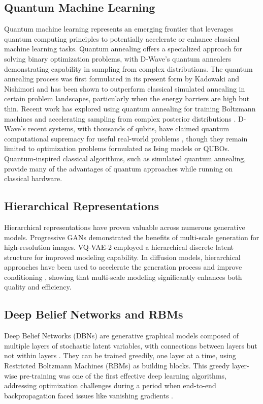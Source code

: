 \documentclass[10pt,twocolumn,letterpaper]{article}
\begin{document}
\subsection{Quantum Machine Learning}
Quantum machine learning represents an emerging frontier that leverages quantum computing principles to potentially accelerate or enhance classical machine learning tasks. Quantum annealing \cite{quantum_annealing, kadowaki1998quantum} offers a specialized approach for solving binary optimization problems, with D-Wave's quantum annealers demonstrating capability in sampling from complex distributions. The quantum annealing process was first formulated in its present form by Kadowaki and Nishimori \cite{kadowaki1998quantum} and has been shown to outperform classical simulated annealing \cite{kirkpatrick1983optimization} in certain problem landscapes, particularly when the energy barriers are high but thin. Recent work has explored using quantum annealing for training Boltzmann machines \cite{qbm, amin2018quantum} and accelerating sampling from complex posterior distributions \cite{quantum_sampling}. D-Wave's recent systems, with thousands of qubits, have claimed quantum computational supremacy for useful real-world problems \cite{dwave2025beyond}, though they remain limited to optimization problems formulated as Ising models or QUBOs. Quantum-inspired classical algorithms, such as simulated quantum annealing, provide many of the advantages of quantum approaches while running on classical hardware.

\subsection{Hierarchical Representations}
Hierarchical representations have proven valuable across numerous generative models. Progressive GANs \cite{pggan} demonstrated the benefits of multi-scale generation for high-resolution images. VQ-VAE-2 \cite{vqvae2} employed a hierarchical discrete latent structure for improved modeling capability. In diffusion models, hierarchical approaches have been used to accelerate the generation process \cite{hierarchical_diffusion} and improve conditioning \cite{imagen}, showing that multi-scale modeling significantly enhances both quality and efficiency.

\subsection{Deep Belief Networks and RBMs}
Deep Belief Networks (DBNs) are generative graphical models composed of multiple layers of stochastic latent variables, with connections between layers but not within layers \cite{hinton2006fast, hinton2009dbn}. They can be trained greedily, one layer at a time, using Restricted Boltzmann Machines (RBMs) as building blocks. This greedy layer-wise pre-training was one of the first effective deep learning algorithms, addressing optimization challenges during a period when end-to-end backpropagation faced issues like vanishing gradients \cite{hinton2006fast}. 
\end{document}

